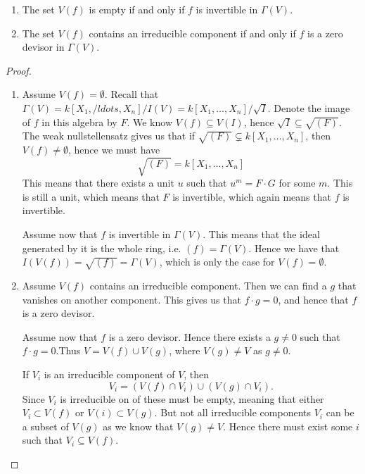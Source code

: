 \begin{proposition}
\begin{enumerate}
    \item The set $V(f)$ is empty if and only if $f$ is invertible in $\Gamma (V)$. 
    \item The set $V(f)$ contains an irreducible component if and only if $f$ is a zero devisor in $\Gamma(V)$.
\end{enumerate}
\end{proposition}
\begin{proof}
\begin{enumerate}
    \item Assume $V(f) = \emptyset$. Recall that $\Gamma(V) = k[X_1, /ldots, X_n]/I(V) = k[X_1, \ldots, X_n]/\sqrt{I}$. Denote the image of $f$ in this algebra by $F$. We know $V(f)\subseteq V(I)$, hence $\sqrt{I}\subseteq \sqrt{(F)}$. The weak nullstellensatz gives us that if $\sqrt{(F)}\subsetneq k[X_1, \ldots, X_n]$, then $V(f)\neq \emptyset$, hence we must have 
    \begin{equation*}
        \sqrt{(F)}=k[X_1, \ldots, X_n]
    \end{equation*}
    This means that there exists a unit $u$ such that $u^m = F\cdot G$ for some $m$. This is still a unit, which means that $F$ is invertible, which again means that $f$ is invertible. 
    
    Assume now that $f$ is invertible in $\Gamma(V)$. This means that the ideal generated by it is the whole ring, i.e. $(f)=\Gamma(V)$. Hence we have that $I(V(f))=\sqrt{(f)}=\Gamma(V)$, which is only the case for $V(f)=\emptyset$. 
    
    \item Assume $V(f)$ contains an irreducible component. Then we can find a $g$ that vanishes on another component. This gives us that $f\cdot g = 0$, and hence that $f$ is a zero devisor. 
    
    Assume now that $f$ is a zero devisor. Hence there exists a $g\neq 0$ such that $f\cdot g = 0$.Thus $V=V(f)\cup V(g)$, where $V(g)\neq V$ as $g\neq 0$. 
    
    If $V_i$ is an irreducible component of $V$, then
    \begin{equation*}
        V_i = (V(f)\cap V_i)\cup (V(g)\cap V_i).
    \end{equation*}
    Since $V_i$ is irreducible on of these must be empty, meaning that either $V_i\subset V(f)$ or $V(i)\subset V(g)$. But not all irreducible components $V_i$ can be a subset of $V(g)$ as we know that $V(g)\neq V$. Hence there must exist some $i$ such that $V_i\subseteq V(f)$. 
\end{enumerate}
\end{proof}



